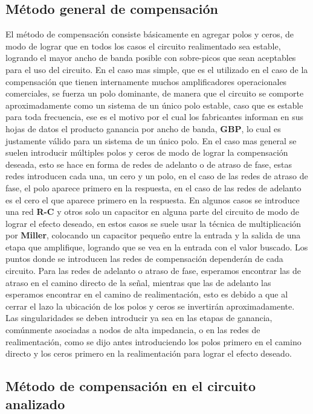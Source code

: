 \subsection{Método general de compensación}

El método de compensación consiste básicamente en agregar polos y ceros, de modo de lograr que en todos los casos el circuito realimentado sea estable, logrando el mayor ancho de banda posible con sobre-picos que sean aceptables para el uso del circuito. En el caso mas simple, que es el utilizado en el caso de la compensación que tienen internamente muchos amplificadores operacionales comerciales, se fuerza un polo dominante, de manera que el circuito se comporte aproximadamente como un sistema de un único polo estable, caso que es estable para toda frecuencia, ese es el motivo por el cual los fabricantes informan en sus hojas de datos el producto ganancia por ancho de banda, \textbf{GBP}, lo cual es justamente válido para un sistema de un único polo. En el caso mas general se suelen introducir múltiples polos y ceros de modo de lograr la compensación deseada, esto se hace en forma de redes de adelanto o de atraso de fase, estas redes introducen cada una, un cero y un polo, en el caso de las redes de atraso de fase, el polo aparece primero en la respuesta, en el caso de las redes de adelanto es el cero el que aparece primero en la respuesta. En algunos casos se introduce una red \textbf{R-C} y otros solo un capacitor en alguna parte del circuito de modo de lograr el efecto deseado, en estos casos se suele usar la técnica de multiplicación por \textbf{Miller}, colocando un capacitor pequeño entre la entrada y la salida de una etapa que amplifique, logrando que se vea en la entrada con el valor buscado. Los puntos donde se introducen las redes de compensación dependerán de cada circuito. Para las redes de adelanto o atraso de fase, esperamos encontrar las de atraso en el camino directo de la señal, mientras que las de adelanto las esperamos encontrar en el camino de realimentación, esto es debido a que al cerrar el lazo la ubicación de los polos y ceros se invertirán aproximadamente.\\
Las singularidades se deben introducir ya sea en las etapas de ganancia, comúnmente asociadas a nodos de alta impedancia, o en las redes de realimentación, como se dijo antes introduciendo los polos primero en el camino directo y los ceros primero en la realimentación para lograr el efecto deseado.



\subsection{Método de compensación en el circuito analizado}


